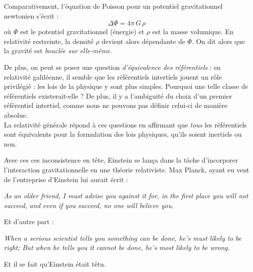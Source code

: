 \begin{enumerate}
    Comparativement, l'équation de Poisson pour un potentiel gravitationnel newtonien s'écrit : 
    \begin{equation}
        \Delta \Phi = 4\pi \, G \,\rho
    \end{equation}
    où $\Phi$ est le potentiel gravitationnel (énergie) et $\rho$ est la masse volumique. En relativité restreinte, la densité $\rho$ devient alors dépendante de $\Phi$. On dit alors que la gravité est \emph{bouclée sur elle-même}. \\
 \end{enumerate}
 De plus, on peut se poser une question \emph{d'équivalence des référentiels} : en relativité galiléenne, il semble que les référentiels intertiels jouent un rôle privilégié : les lois de la physique y sont plus simples. Pourquoi une telle classe de référentiels existerait-elle ? De plus, il y a l'ambiguité du choix d'un premier référentiel intertiel, comme nous ne pouvons pas définir celui-ci de manière absolue. \\
 La relativité générale répond à ces questions en affirmant que \emph{tous} les référentiels sont équivalents pour la formulation des lois physiques, qu'ils soient inertiels ou non.

Avec ces ces inconsistence en tête, Einstein se lança dans la tâche d'incorporer l'interaction gravitationnelle en une théorie relativiste. Max Planck, ayant eu vent de l'entreprise d'Einstein lui aurait écrit :
\begin{center}
    \textit{As an older friend, I must advise you against it for, in the first place you will not succeed, and even if you succeed, no one will believe you.}
\end{center}
Et d'autre part :
\begin{center}
    \textit{When a serious scientist tells you something can be done, he's must likely to be right; But when he tells you it cannot be done, he's most likely to be wrong.}
\end{center}
Et il se fait qu'Einstein était têtu.
